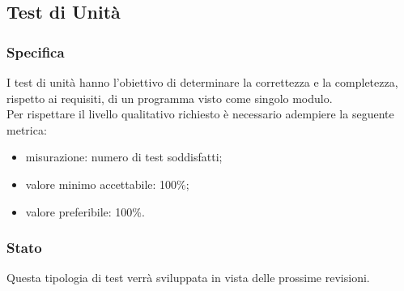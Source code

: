 \subsection{Test di Unità}

	\subsubsection{Specifica}
		I test di unità hanno l'obiettivo di determinare la correttezza e la completezza, rispetto ai requisiti, di un programma visto come singolo modulo.\\
		Per rispettare il livello qualitativo richiesto è necessario adempiere la seguente metrica:
		\begin{itemize}
			\item{misurazione: numero di test soddisfatti;}
			\item{valore minimo accettabile: 100\%;}
			\item{valore preferibile: 100\%.}
		\end{itemize}


	\subsubsection{Stato}
		Questa tipologia di test verrà sviluppata in vista delle prossime revisioni.
			
			
